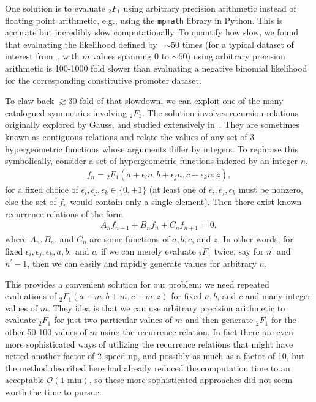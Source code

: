 One solution is to evaluate ${_2F_1}$ using arbitrary precision arithmetic
instead of floating point arithmetic,
e.g., using the \texttt{mpmath} library in Python.
This is accurate but incredibly slow computationally.
To quantify how slow, we found that
evaluating the likelihood defined by~ $\sim50$ times
(for a typical dataset of interest from~\cite{Jones2014},
with $m$ values spanning 0 to $\sim50$)
using arbitrary precision arithmetic is 100-1000 fold slower than
evaluating a negative binomial likelihood for the corresponding
constitutive promoter dataset.

To claw back $\gtrsim30$ fold of that slowdown, we can exploit
one of the many catalogued symmetries involving ${_2F_1}$.
The solution involves recursion relations originally explored by Gauss,
and studied extensively in~\cite{Pearson2017, Gil2007}.
They are sometimes known as contiguous relations and relate the values
of any set of 3 hypergeometric functions whose arguments differ by integers.
To rephrase this symbolically, consider a set of hypergeometric functions
indexed by an integer $n$,
\begin{align}
f_n = {_2F_1}(a+\epsilon_i n, b+\epsilon_j n, c+\epsilon_k n; z),
\end{align}
for a fixed choice of $\epsilon_i, \epsilon_j, \epsilon_k \in \{0,\pm 1\}$
(at least one of $\epsilon_i, \epsilon_j, \epsilon_k$ must be nonzero,
else the set of $f_n$ would contain only a single element).
Then there exist known recurrence relations of the form
\begin{align}
A_n f_{n-1} + B_n f_{n} + C_n f_{n+1} = 0,
\end{align}
where $A_n, B_n$, and $C_n$ are some functions of $a,b,c$, and $z$.
In other words, for fixed $\epsilon_i, \epsilon_j, \epsilon_k, a, b,$ and $c$,
if we can merely evaluate ${_2F_1}$ twice, say for $n^\prime$ and $n^\prime-1$,
then we can easily and rapidly generate values for arbitrary $n$.

This provides a convenient solution for our problem: we need repeated
evaluations of ${_2F_1}(a+m, b+m, c+m; z)$
for fixed $a,b$, and $c$ and many integer values of $m$.
They idea is that we can use arbitrary precision arithmetic to evaluate
${_2F_1}$ for just two particular values of $m$ and then generate
${_2F_1}$ for the other 50-100 values of $m$ using the recurrence
relation.
In fact there are even more sophisticated ways of utilizing the recurrence
relations that might have netted another factor of 2 speed-up, and
possibly as much as a factor of 10, but the method described here had
already reduced the computation time to an acceptable
$\mathcal{O}(\text{1 min})$, so these more sophisticated approaches did
not seem worth the time to pursue.


